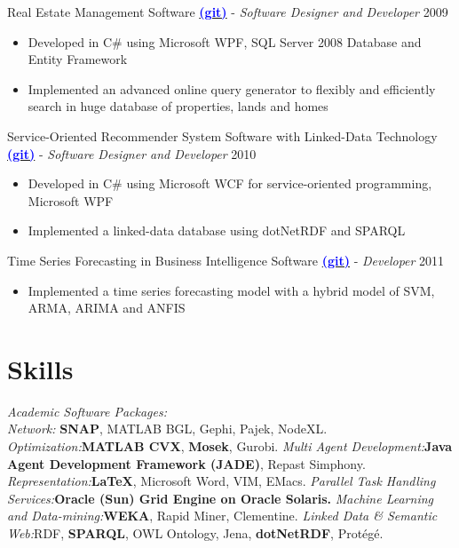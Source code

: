\documentclass[letter]{res}
\begin{document}
\begin{resume}
Real Estate Management Software {\href{https://github.com/omid55/real_state_manager}{\textbf{\textcolor{blue}{(git)}}}}
\newline
- {\sl Software Designer and Developer} \hfill 2009\\
   \vspace{-4mm}
   \iflong
     \begin{itemize}
        \item Developed in C\# using Microsoft WPF, SQL Server 2008 Database and Entity Framework
        \item Implemented an advanced online query generator to flexibly and efficiently search in huge database of properties, lands and homes
     \end{itemize}
   \fi
   
Service-Oriented Recommender System Software with Linked-Data Technology {\href{https://github.com/omid55/service_oriented_linked_data_based_recommender_system}{\textbf{\textcolor{blue}{(git)}}}}
\newline
- {\sl Software Designer and Developer} \hfill 2010\\
   \vspace{-4mm}
   \iflong
     \begin{itemize}
        \item Developed in C\# using Microsoft WCF for service-oriented programming, Microsoft WPF
        \item Implemented a linked-data database using dotNetRDF and SPARQL
     \end{itemize}
   \fi

Time Series Forecasting in Business Intelligence Software {\href{https://github.com/omid55/time_series_forecasting_business_intelligence}{\textbf{\textcolor{blue}{(git)}}}}
\newline
- {\sl Developer} \hfill 2011\\
   \vspace{-4mm}
   \iflong
     \begin{itemize}
        \item Implemented a time series forecasting model with a hybrid model of SVM, ARMA, ARIMA and ANFIS
     \end{itemize}
   \fi

\section{Skills}
\textit{Academic Software Packages:}\\
{\sl Network:} \textbf{SNAP}, MATLAB BGL, Gephi, Pajek, NodeXL.
{\sl Optimization:}\textbf{MATLAB CVX}, \textbf{Mosek}, Gurobi.
{\sl Multi Agent Development:}\textbf{Java Agent Development Framework (JADE)}, Repast Simphony.
{\sl Representation:}\textbf{\LaTeX}, Microsoft Word, VIM, EMacs.
{\sl Parallel Task Handling Services:}{\textbf{Oracle (Sun) Grid Engine on Oracle Solaris.}}
{\sl Machine Learning and Data-mining:}{\textbf{WEKA}, Rapid Miner, Clementine.}
{\sl Linked Data \& Semantic Web:}{RDF, \textbf{SPARQL}, OWL Ontology, Jena,
\textbf{dotNetRDF}, Prot\'{e}g\'{e}.}
\vspace{-2mm}


\end{resume}
\end{document}
